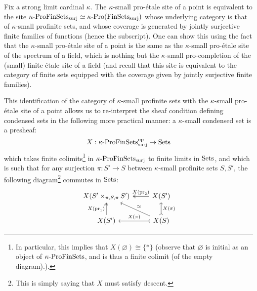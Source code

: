            \begin{remark} \label{remark: condensedness_and_profiniteness}
                Fix a strong limit cardinal $\kappa$. The $\kappa$-small pro-\'etale site of a point is equivalent to the site $\kappa\text{-}\mathrm{Pro}\mathrm{Fin}\mathrm{Sets}_{\mathrm{surj}} \simeq \kappa\text{-}\mathrm{Pro}(\mathrm{Fin}\mathrm{Sets}_{\mathrm{surj}})$ whose underlying category is that of $\kappa$-small profinite sets, and whose coverage is generated by jointly surjective finite families of functions (hence the subscript). One can show this using the fact that the $\kappa$-small pro-\'etale site of a point is the same as the $\kappa$-small pro-\'etale site of the spectrum of a field, which is nothing but the $\kappa$-small pro-completion of the (small) finite \'etale site of a field (and recall that this site is equivalent to the category of finite sets equipped with the coverage given by jointly surjective finite families). 
                
                This identification of the category of $\kappa$-small profinite sets with the $\kappa$-small pro-\'etale site of a point allows us to re-interpret the sheaf condition defining condensed sets in the following more practical manner: a $\kappa$-small condensed set is a presheaf:
                    $$X: \kappa\text{-}\mathrm{Pro}\mathrm{Fin}\mathrm{Sets}_{\mathrm{surj}}^{\mathrm{op}} \to \mathrm{Sets}$$
                which takes finite colimits\footnote{In particular, this implies that $X(\varnothing) \cong \{*\}$ (observe that $\varnothing$ is initial as an object of $\kappa\text{-}\mathrm{Pro}\mathrm{Fin}\mathrm{Sets}$, and is thus a finite colimit (of the empty diagram).).} in $\kappa\text{-}\mathrm{Pro}\mathrm{Fin}\mathrm{Sets}_{\mathrm{surj}}$ to finite limits in $\mathrm{Sets}$, and which is such that for any surjection $\pi: S' \to S$ between $\kappa$-small profinite sets $S, S'$, the following diagram\footnote{This is simply saying that $X$ must satisfy descent.} commutes in $\mathrm{Sets}$:
                    $$
                        \begin{tikzcd}
                        	{X(S' \x_{\pi, S, \pi} S')} & {X(S')} \\
                        	{X(S')} & {X(S)}
                        	\arrow["{X(\pr_1)}", two heads, from=2-1, to=1-1]
                        	\arrow["{X(\pi)}"', tail, from=2-2, to=2-1]
                        	\arrow["{X(\pr_2)}"', two heads, from=1-2, to=1-1]
                        	\arrow["{X(\pi)}"', tail, from=2-2, to=1-2]
                        	\arrow["\cong"', from=2-2, to=1-1]
                        \end{tikzcd}
                    $$
            \end{remark}
            
